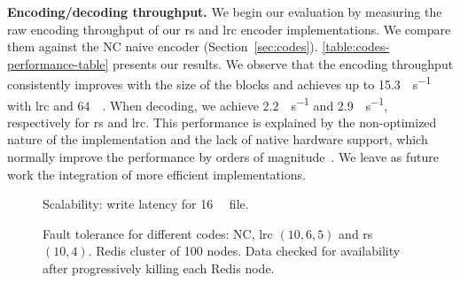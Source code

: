\textbf{Encoding/decoding throughput.}%
\label{subsec:rw-perf}
We begin our evaluation by measuring the raw encoding throughput of our \ac{rs} and \ac{lrc} encoder implementations.
We compare them against the NC naive encoder (Section~\ref{sec:codes}).
\autoref{table:codes-performance-table} presents our results.  We observe that the encoding throughput consistently improves with the size of the blocks and achieves up to 15.3\si{\mega\byte\per\second} with \ac{lrc} and \SI{64}{\mega\byte}.
When decoding, we achieve 2.2\si{\mega\byte\per\second} and 2.9\si{\mega\byte\per\second}, respectively for \ac{rs} and \ac{lrc}.
This performance is explained by the non-optimized nature of the implementation and the lack of native hardware support, which normally improve the performance by orders of magnitude~\cite{Burihabwa2016}. We leave as future work the integration of more efficient implementations.


\begin{figure}[t]
    \centering
    
    \caption{Scalability: write latency for \SI{16}{\mebi\byte} file.}
    \label{fig:latency-plot}
\end{figure}


\begin{table}
    \centering
    \caption{Encoding throughput of the different encoders in \si{\mega\byte\per\second}}
    
    \label{table:codes-performance-table}
\end{table}


\begin{figure}[ht]
    \centering
    
    \caption{Fault tolerance for different codes: NC, \ac{lrc} $\left(10,6,5\right)$ and \ac{rs} $\left(10,4\right)$. Redis cluster of 100 nodes. Data checked for availability after progressively killing each Redis node.}
    \label{fig:checksum-plot}
\end{figure}


